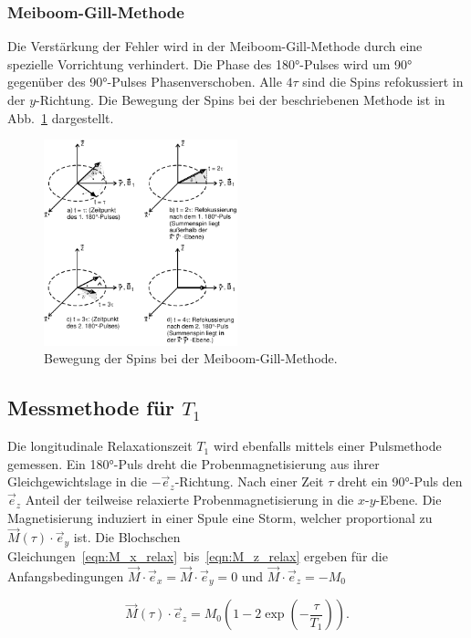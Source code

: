 \subsubsection{Meiboom-Gill-Methode}
Die Verstärkung der Fehler wird in der Meiboom-Gill-Methode durch eine spezielle
Vorrichtung verhindert. Die Phase des 180°-Pulses wird um 90° gegenüber des
90°-Pulses Phasenverschoben. Alle $4\tau$ sind die Spins refokussiert in der
$y$-Richtung. Die Bewegung der Spins bei der beschriebenen Methode ist in
Abb.~\ref{fig:meiboom_gill} dargestellt.

\begin{figure}
  \centering
  \includegraphics[width = 0.5\textwidth]{Pics/meiboom.pdf}
  \caption{Bewegung der Spins bei der Meiboom-Gill-Methode\cite{anleitung}.}
  \label{fig:meiboom_gill}
\end{figure}

\subsection{Messmethode für $T_1$}

Die longitudinale Relaxationszeit $T_1$ wird ebenfalls mittels einer Pulsmethode
gemessen. Ein 180°-Puls dreht die Probenmagnetisierung aus ihrer Gleichgewichtslage
in die $-\vec{e}_z$-Richtung. Nach einer Zeit $\tau$ dreht ein 90°-Puls
den $\vec{e}_z$ Anteil der teilweise relaxierte Probenmagnetisierung
in die $x$-$y$-Ebene. Die Magnetisierung induziert in einer Spule eine Storm,
welcher proportional zu $\vec{M}(\tau)\cdot\vec{e}_y$ ist.
Die Blochschen Gleichungen~\eqref{eqn:M_x_relax}~bis~\eqref{eqn:M_z_relax}
ergeben für die Anfangsbedingungen $\vec{M}\cdot\vec{e}_x = \vec{M}\cdot\vec{e}_y = 0$
und $\vec{M}\cdot\vec{e}_z = -M_0$

\begin{equation}
  \label{eqn:zeit_mag}
  \vec{M}(\tau)\cdot\vec{e}_z = M_0\left(1-2\exp{\left(-\frac{\tau}{T_1}\right)}\right).
\end{equation}

